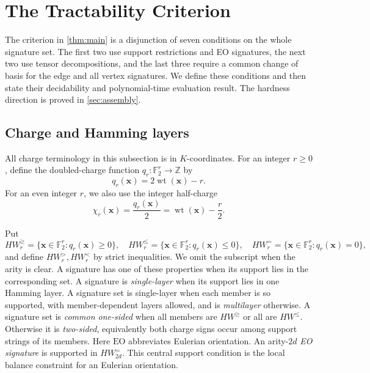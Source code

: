 \documentclass[11pt,letterpaper,onecolumn]{article}
\theoremstyle{plain}
\theoremstyle{definition}
\theoremstyle{remark}
\newcommand{\Ftwo}{\mathbb F_2}
\newcommand{\wt}{\operatorname{wt}}
\newcommand{\EO}{\mathrm{EO}}
\begin{document}
	\section{The Tractability Criterion}
	\label{sec:predicate}
	
The criterion in \cref{thm:main} is a disjunction of seven conditions on
the whole signature set.  The first two use support restrictions and EO
signatures, the next two use tensor decompositions, and the last three
require a common change of basis for the edge and all vertex signatures.
We define these conditions and then state their decidability and
polynomial-time evaluation result.  The hardness direction is proved in
\cref{sec:assembly}.

	\subsection{Charge and Hamming layers}
	\label{subsec:charge}
	
	All charge terminology in this subsection is in \(K\)-coordinates.
	For an integer \(r\ge0\), define
	the doubled-charge function \(q_r:\Ftwo^r\to\mathbb Z\) by
	\[
	q_r({\mathbf x})=2\wt({\mathbf x})-r.
	\]
	For an even integer \(r\), we also use the integer half-charge
	\[
	\chi_r({\mathbf x})=\frac{q_r({\mathbf x})}2=\wt({\mathbf x})-\frac r2.
	\]
	
	Put
	\[
	HW_r^{\ge}=\{{\mathbf x}\in\Ftwo^r:q_r({\mathbf x})\ge0\},
	\quad
	HW_r^{\le}=\{{\mathbf x}\in\Ftwo^r:q_r({\mathbf x})\le0\},
	\quad
	HW_r^{=}=\{{\mathbf x}\in\Ftwo^r:q_r({\mathbf x})=0\},
	\]
	and define \(HW_r^{>},HW_r^{<}\) by strict inequalities.  We omit the
	subscript when the arity is clear.  A signature has one of these properties when its support lies in the
	corresponding set.  A signature is \emph{single-layer} when its support lies
	in one Hamming layer. A signature set is single-layer when each member is so
	supported, with member-dependent layers allowed, and is \emph{multilayer}
	otherwise.  A signature set is \emph{common
		one-sided} when all members are \(HW^{\ge}\) or all are \(HW^{\le}\).
	Otherwise it is \emph{two-sided}, equivalently both charge signs occur among
	support strings of its members.  Here \(\EO\) abbreviates Eulerian orientation.  An
	arity-\(2d\) \emph{EO signature} is supported in \(HW_{2d}^=\). This central
	support condition is the local balance constraint for an Eulerian
	orientation.
	
\end{document}
